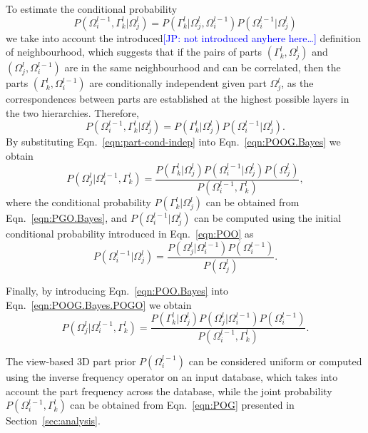 \documentclass[runningheads]{llncs}
\newcommand{\commentJP}[1]{\textcolor{blue}{[JP: #1]}}
\begin{document}
To estimate the conditional probability
\begin{equation}
 P(\Omega_i^{l-1},\Gamma_k^l \vert \Omega_j^{l}) =  P(\Gamma_k^l \vert \Omega_j^{l},\Omega_i^{l-1}) P(\Omega_i^{l-1} \vert \Omega_j^{l})
\end{equation}
we take into account the introduced\commentJP{not introduced anyhere here\dots} definition of neighbourhood, which suggests that if the pairs of parts $(\Gamma_k^l,\Omega_j^{l})$ and $(\Omega_j^{l},\Omega_i^{l-1})$ are in the same neighbourhood and can be correlated, then the parts $(\Gamma_k^l,\Omega_i^{l-1})$ are conditionally independent given part $\Omega_j^{l}$, as the correspondences between parts are established at the highest possible layers in the two hierarchies. Therefore,
\begin{equation}
  P(\Omega_i^{l-1},\Gamma_k^l \vert \Omega_j^{l}) =  P(\Gamma_k^l \vert \Omega_j^{l}) P(\Omega_i^{l-1} \vert \Omega_j^{l}).
  \label{eqn:part-cond-indep}
\end{equation}
By substituting Eqn.~\ref{eqn:part-cond-indep} into Eqn.~\ref{eqn:POOG.Bayes} we obtain
\begin{equation}
  P(\Omega_j^{l} \vert \Omega_i^{l-1},\Gamma_k^l) = \frac{P(\Gamma_k^l \vert \Omega_j^{l})P(\Omega_i^{l-1} \vert \Omega_j^{l})P(\Omega_j^{l})}{P(\Omega_i^{l-1},\Gamma_k^l)},
  \label{eqn:POOG.Bayes.POGO}
\end{equation}
where the conditional probability $P(\Gamma_k^l \vert \Omega_j^l)$ can be obtained from Eqn.~\ref{eqn:PGO.Bayes}, and $P(\Omega_i^{l-1} \vert \Omega_j^{l})$ can be computed using the initial conditional probability introduced in Eqn.~\ref{eqn:POO} as
\begin{equation}
  P(\Omega_i^{l-1} \vert \Omega_j^{l}) = \frac{P(\Omega_j^{l}\vert \Omega_i^{l-1})P(\Omega_i^{l-1})}{P(\Omega_j^{l})}.
  \label{eqn:POO.Bayes}
 \end{equation}

Finally, by introducing Eqn.~\ref{eqn:POO.Bayes} into Eqn.~\ref{eqn:POOG.Bayes.POGO} we obtain
\begin{equation}
 P(\Omega_j^{l} \vert \Omega_i^{l-1},\Gamma_k^l) = \frac{P(\Gamma_k^l \vert \Omega_j^{l})P(\Omega_j^{l} \vert \Omega_i^{l-1})P(\Omega_i^{l-1})}{P(\Omega_i^{l-1},\Gamma_k^l)}.
\end{equation}
  
The view-based 3D part prior $P(\Omega_i^{l-1})$ can be considered uniform or computed using the inverse frequency operator on an input database, which takes into account the part frequency across the database, while the joint probability $P(\Omega_i^{l-1},\Gamma_k^l)$ can be obtained from Eqn.~\ref{eqn:POG} presented in Section~\ref{sec:analysis}.
\end{document}
